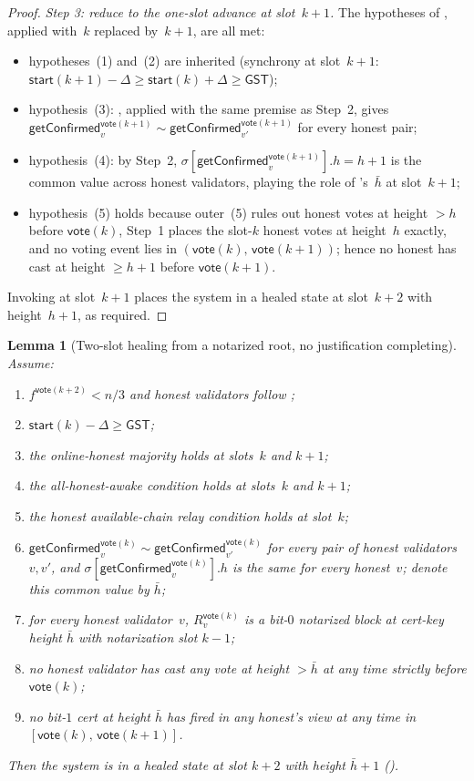 \documentclass{article}
\newcommand{\start}{\mathsf{start}}
\newcommand{\vote}{\mathsf{vote}}
\newcommand{\comm}[1]{\bar{#1}}
\newcommand{\getConfirmed}{\textsf{getConfirmed}\xspace}
\theoremstyle{plain}
\newtheorem{lemma}{Lemma}
\theoremstyle{definition}
\theoremstyle{remark}
\newcommand{\GST}{\ensuremath{\mathsf{GST}}}
\newcommand{\OHM}{online-honest majority\xspace}
\newcommand{\HAR}{honest available-chain relay\xspace}
\newcommand{\AHA}{all-honest-awake\xspace}
\begin{document}
\begin{proof}
\emph{Step 3: reduce to the one-slot advance at slot~$k+1$.}
The hypotheses of , applied with~$k$ replaced by~$k+1$, are all met:
\begin{itemize}
  \item hypotheses~(1) and~(2) are inherited (synchrony at slot~$k+1$: $\start(k+1) - \Delta \geq \start(k) + \Delta \geq \GST$);
  \item hypothesis~(3): , applied with the same premise as Step~2, gives $\getConfirmed_v^{\vote(k+1)} \sim \getConfirmed_{v'}^{\vote(k+1)}$ for every honest pair;
  \item hypothesis~(4): by Step~2, $\sigma[\getConfirmed_v^{\vote(k+1)}].h = h + 1$ is the common value across honest validators, playing the role of 's~$\comm{h}$ at slot~$k+1$;
  \item hypothesis~(5) holds because outer~(5) rules out honest votes at height $>h$ before $\vote(k)$, Step~1 places the slot-$k$ honest votes at height~$h$ exactly, and no voting event lies in $(\vote(k),\, \vote(k+1))$; hence no honest has cast at height $\geq h+1$ before $\vote(k+1)$.
\end{itemize}
Invoking  at slot~$k+1$ places the system in a healed state at slot~$k+2$ with height~$h+1$, as required.
\end{proof}

\begin{lemma}[Two-slot healing from a notarized root, no justification completing]\label{rev:lem:healing-from-notarized-no-just}
Assume:
\begin{enumerate}
  \item $f^{\vote(k+2)} < n/3$ and honest validators follow ;
  \item $\start(k) - \Delta \geq \GST$;
  \item the \OHM holds at slots~$k$ and $k+1$;
  \item the \AHA condition holds at slots~$k$ and $k+1$;
  \item the \HAR condition holds at slot~$k$;
  \item $\getConfirmed_v^{\vote(k)} \sim \getConfirmed_{v'}^{\vote(k)}$ for every pair of honest validators~$v, v'$, and $\sigma[\getConfirmed_v^{\vote(k)}].h$ is the same for every honest~$v$; denote this common value by $\comm{h}$;
  \item for every honest validator~$v$, $R_v^{\vote(k)}$ is a bit-$0$ notarized block at cert-key height $\comm{h}$ with notarization slot $k-1$;
  \item no honest validator has cast any vote at height $> \comm{h}$ at any time strictly before $\vote(k)$;
  \item no bit-$1$ cert at height $\comm{h}$ has fired in any honest's view at any time in $[\vote(k),\, \vote(k+1)]$.
\end{enumerate}
Then the system is in a healed state at slot $k+2$ with height $\comm{h}+1$ ().
\end{lemma}
\end{document}
